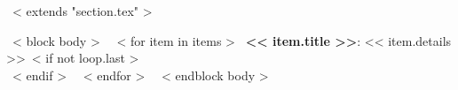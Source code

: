 ~< extends "section.tex" >~

~< block body >~
~< for item in items >~
\textbf{<< item.title >>}: << item.details >>~< if not loop.last >~ \\
~< endif >~
~< endfor >~
~< endblock body >~
